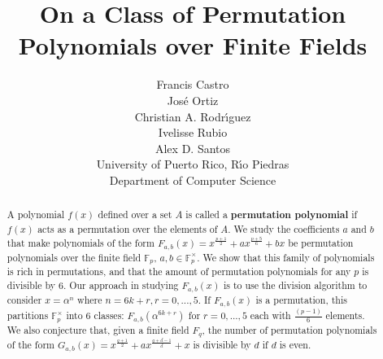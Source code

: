 \documentclass[12pt]{article}
\title{On a Class of Permutation Polynomials over Finite Fields}
\author{Francis Castro \\ Jos\'e Ortiz \\ Christian A. Rodr\'{\i}guez \\ Ivelisse Rubio \\ Alex D. Santos \\ University of Puerto Rico, R\'{\i}o Piedras \\ Department of Computer Science}
\date{}
\begin{document}
\maketitle

\begin{abstract}

A polynomial $f(x)$ defined over a set $A$ is called a \textbf{permutation polynomial} if $f(x)$ acts as a permutation over the elements of $A$. We study the coefficients $a$ and $b$ that make polynomials of the form $F_{a,b}(x)=x^{\frac{p+1}{2}} + ax^{\frac{p+5}{6}} + bx$ be permutation polynomials over the finite field $\mathbb{F}_{p}$, $a,b \in \mathbb{F}_{p}^{\times}$. We show that this family of polynomials is rich in permutations, and that the amount of permutation polynomials for any $p$ is divisible by $6$. Our approach in studying $F_{a,b}(x)$ is to use the division algorithm to consider $x=\alpha^{n}$ where $n=6k+r, r=0,...,5$. If $F_{a,b}(x)$ is a permutation, this partitions $\mathbb{F}_{p}^{\times}$ into 6 classes: $F_{a,b}(\alpha^{6k+r})$ for $r=0,...,5$ each with $\frac{(p-1)}{6}$ elements. We also conjecture that, given a finite field $F_q$, the number of permutation polynomials of the form $G_{a,b}(x)=x^{\frac{q+1}{2}} + ax^{\frac{q+d-1}{d}}+x$ is divisible by $d$ if $d$ is even.

\end{abstract}
\end{document}
